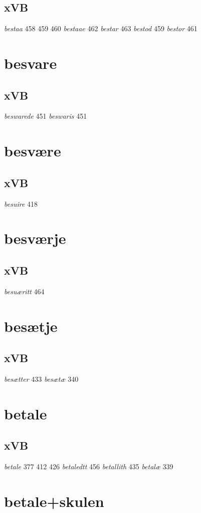 \documentclass[a4paper,twocolumn]{article}
\begin{document}
\subsection{xVB}
\label{sec:orgb459e87}
\emph{bestaa} 458 459 460 \emph{bestaae} 462 \emph{bestar} 463 \emph{bestod} 459 \emph{bestor} 461 
\section{besvare}
\label{sec:org4d944f4}
\subsection{xVB}
\label{sec:org0b0948f}
\emph{beswarede} 451 \emph{beswaris} 451 
\section{besvære}
\label{sec:orgfacf6c0}
\subsection{xVB}
\label{sec:org3a906af}
\emph{besuire} 418 
\section{besværje}
\label{sec:orgc23f276}
\subsection{xVB}
\label{sec:org5cf506c}
\emph{besuæritt} 464 
\section{besætje}
\label{sec:org3f99958}
\subsection{xVB}
\label{sec:org52ae89b}
\emph{besætter} 433 \emph{besætæ} 340 
\section{betale}
\label{sec:org074bdb7}
\subsection{xVB}
\label{sec:org9ad168c}
\emph{betale} 377 412 426 \emph{betaledtt} 456 \emph{betallith} 435 \emph{betalæ} 339 
\section{betale+skulen}
\label{sec:orgfcfc00e}
\end{document}
